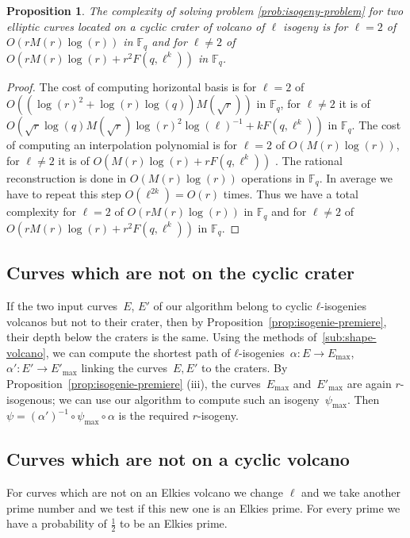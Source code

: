 \documentclass{lms}
\newtheorem{prop}[thm]{Proposition}
\begin{document}
\begin{prop}
The complexity of solving problem \ref{prob:isogeny-problem} for two elliptic curves located on a cyclic crater of volcano of $\ell$ isogeny is for $\ell=2$ of $O(rM(r)\log(r))$ in $\mathbb{F}_q$ and for $\ell \neq 2$ of $O(rM(r)\log(r)+r^2F(q,\ell^k))$ in $\mathbb{F}_q$.
\end{prop}

\begin{proof}%
The cost of computing horizontal basis is for $\ell=2$ of $O((\log(r)^2+\log(r)\log(q))M(\sqrt{r}))$ in $\mathbb{F}_q$, for $\ell \neq 2$ it is of $O(\sqrt{r}\log(q)M(\sqrt{r})\log(r)^2 \log(\ell)^{-1}+kF(q,\ell^k))$ in $\mathbb{F}_q$.
The cost of computing an interpolation polynomial is for $\ell=2$ of $O(M(r)\log(r))$, for $\ell \neq 2$ it is of $O(M(r)\log(r)+rF(q,\ell^k))$ . The rational reconstruction is done in $O(M(r)\log(r))$ operations in $\mathbb{F}_q$. In average we have to repeat this step $O(\ell^{2k})=O(r)$ times. 
Thus we have a total complexity for $\ell=2$ of  $O(rM(r)\log(r))$ in $\mathbb{F}_q$ and for $\ell \neq 2$ of $O(rM(r)\log(r)+r^2F(q,\ell^k))$ in $\mathbb{F}_q$.
\end{proof}
  
  \subsection{Curves which are not on the cyclic crater}

If the two input curves~$E$, $E'$ of our algorithm
belong to cyclic $ℓ$-isogenies volcanos but not to their crater,
then by Proposition~\ref{prop:isogenie-premiere},
their depth below the craters is the same.
Using the methods of~\ref{sub:shape-volcano},
we can compute the shortest path of $ℓ$-isogenies~$α: E → E_{\max}$,
$α': E' → E'_{\max}$ linking the curves~$E, E'$ to the craters.
By Proposition~\ref{prop:isogenie-premiere} (iii),
the curves~$E_{\max}$ and~$E'_{\max}$ are again $r$-isogenous;
we can use our algorithm to compute such an isogeny~$ψ_{\max}$.
Then $ψ = (α')^{-1} ∘ ψ_{\max} ∘ α$ is the required $r$-isogeny.

  \subsection{Curves which are not on a cyclic volcano}
  For curves which are not on an Elkies volcano we change $\ell$ and we take another prime number and we test if this new one is an Elkies prime. For every prime we have a probability of $\frac{1}{2}$ to be an Elkies prime. 
\end{document}
